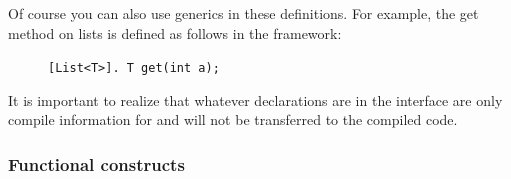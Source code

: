 Of course you can also use generics in these definitions. For example, the get method on lists is defined as follows in the \vonda framework:

\begin{figure}[htbp]
\centering
\texttt{[List<T>]. T get(int a);}
\end{figure}
%


It is important to realize that whatever declarations are in the interface are only compile information for \vonda and will not be transferred to the compiled code.



\subsubsection{Functional constructs}

